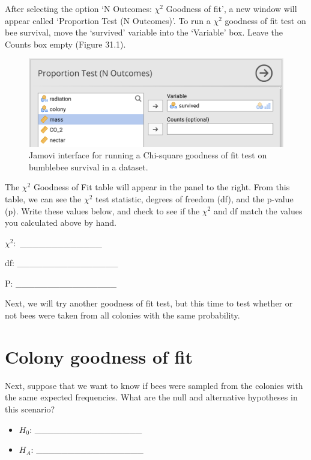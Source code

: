 \documentclass[
  openany]{krantz}
\begin{document}
After selecting the option `N Outcomes: \(\chi^{2}\) Goodness of fit', a new window will appear called `Proportion Test (N Outcomes)'.
To run a \(\chi^{2}\) goodness of fit test on bee survival, move the `survived' variable into the `Variable' box.
Leave the Counts box empty (Figure 31.1).

\begin{figure}
\includegraphics[width=1\linewidth]{img/jamovi_goodness_of_fit_interface} \caption{Jamovi interface for running a Chi-square goodness of fit test on bumblebee survival in a dataset.}\label{fig:unnamed-chunk-132}
\end{figure}

The \(\chi^{2}\) Goodness of Fit table will appear in the panel to the right.
From this table, we can see the \(\chi^{2}\) test statistic, degrees of freedom (df), and the p-value (p).
Write these values below, and check to see if the \(\chi^{2}\) and df match the values you calculated above by hand.

\(\chi^{2}:\) \_\_\_\_\_\_\_\_\_\_\_\_\_

df: \_\_\_\_\_\_\_\_\_\_\_\_\_\_\_\_

P: \_\_\_\_\_\_\_\_\_\_\_\_\_\_\_\_

Next, we will try another goodness of fit test, but this time to test whether or not bees were taken from all colonies with the same probability.

\hypertarget{colony-goodness-of-fit}{%
\section{Colony goodness of fit}\label{colony-goodness-of-fit}}

Next, suppose that we want to know if bees were sampled from the colonies with the same expected frequencies.
What are the null and alternative hypotheses in this scenario?

\begin{itemize}
\item
  \(H_{0}\): \_\_\_\_\_\_\_\_\_\_\_\_\_\_\_\_\_
\item
  \(H_{A}\): \_\_\_\_\_\_\_\_\_\_\_\_\_\_\_\_\_
\end{itemize}
\end{document}
